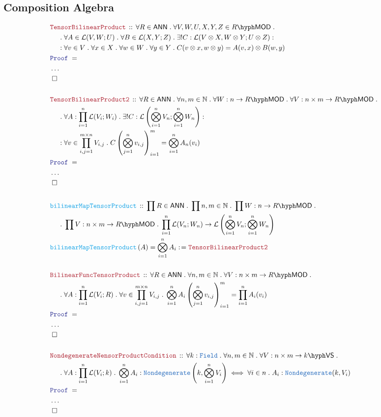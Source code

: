 \documentclass[12pt]{scrartcl}%
\newcommand{\TYPE}[1]{\textcolor{NavyBlue}{\mathtt{#1}}}%
\newcommand{\FUNC}[1]{\textcolor{Cerulean}{\mathtt{#1}}}%
\newcommand{\LOGIC}[1]{\textcolor{Blue}{\mathtt{#1}}}%
\newcommand{\THM}[1]{\textcolor{Maroon}{\mathtt{#1}}}%
\renewcommand{\.}{\; . \;} %
\newcommand{\de}{: \kern 0.1pc =} %
\newcommand{\Act}[1]{\left( #1 \right)} %
\newcommand{\Theorem}[2]{& \THM{#1} \, :: \, #2 \\ & \Proof = \\ } %
\newcommand{\DeclareFunc}[2]{& \FUNC{#1} \, :: \, #2 \\}%
\newcommand{\DefineNamedFunc}[4]{&  \FUNC{#1}\Act{#2} = #3 \de #4 \\}%
\newcommand{\NewLine}{\\ & \kern 1pc}%
\newcommand{\Page}[1]{ \begin{align*} #1 \end{align*}  }%
\newcommand{\NoProof}{ & \ldots \\ \EndProof}%
\newcommand{\Nat}{\mathbb{N}}%
\newcommand{\QED}{\; \square} %
\newcommand{\EndProof}{& \QED \\} %
\newcommand{\Proof}{\LOGIC{Proof} \; } %
\newcommand{\VS}[1]{#1\hyph\mathsf{VS}} %
\newcommand{\LMOD}[1]{#1\hyph\mathsf{MOD}} %
\renewcommand{\L}{\mathcal{L}}
\newcommand{\Field}{\TYPE{Field}}
\newcommand{\ANN}{\mathsf{ANN}} %
\begin{document}
\subsection{Composition Algebra}
\Page{
	\Theorem{TensorBilinearProduct}
	{
		\forall R \in \ANN \. 
		\forall V,W,U,X,Y,Z \in \LMOD{R} \. \NewLine \.
		\forall A \in \L(V,W;U) \. 
		\forall B \in \L(X,Y;Z) \.  
		\exists! C : \L(V \otimes X, W \otimes Y;U \otimes Z) : \NewLine : 
		\forall v \in V \. \forall x \in X \.
		\forall w \in W \. \forall y \in Y \.
		C(v \otimes x, w \otimes y) = A(v,x) \otimes B(w,y)
	}
	\NoProof
	\\
	\Theorem{TensorBilinearProduct2}
	{
		\forall R \in \ANN \. 
		\forall n,m \in \Nat \.
		\forall W : n \to \LMOD{R} \.
		\forall V : n \times m \to \LMOD{R} \. 
		\NewLine \.
		\forall A  : \prod^n_{i=1} \L(V_i;W_i) \. 
		\exists! C : \L\left( \bigotimes^n_{i=1} V_n ; \bigotimes^n_{i=1} W_n\right) : \NewLine : 
		\forall v \in \prod^{m \times n}_{i,j = 1} V_{i,j} \. 
		C\left(\bigotimes^n_{j=1} v_{i,j}\right)^m_{i=1} = \bigotimes^n_{i=1} A_n(v_i) 
	}
	\NoProof
	\\
	\DeclareFunc{bilinearMapTensorProduct}
	{ 
		\prod R \in \ANN \.
		\prod n,m \in \Nat \.  
		\prod W : n \to \LMOD{R} \. \NewLine \. 
		\prod V : n \times m \to \LMOD{R} \. 
		\prod^n_{i=1} \L(V_n;W_n)  \to \L\left(\bigotimes^n_{i=1} V_n; \bigotimes^n_{i=1} W_n\right) 
	}
	\DefineNamedFunc{bilinearMapTensorProduct}{A}{\bigotimes^n_{i=1} A_i}{ \THM{TensorBilinearProduct2}}
	\\
	\Theorem{BilinearFuncTensorProduct}
	{
		\forall R \in \ANN \.
		\forall n,m \in \Nat \.
		\forall V : n \times m \to \LMOD{R} \. \NewLine \.
		\forall A  : \prod^n_{i=1} \L(V_i;R) \. 
		\forall v \in \prod^{m \times n}_{i,j = 1} V_{i,j} \. 
		\bigotimes^n_{i=1} A_i \left(\bigotimes^n_{j=1} v_{i,j} \right)^m_{i=1} = \prod^n_{i=1} A_i(v_i)
	}
	\NoProof
	\\
	\Theorem{NondegenerateNensorProductCondition}
	{
		\forall k : \Field \.
		\forall n,m \in \Nat \.
		\forall V : n \times m \to \VS{k} \. \NewLine \.
		\forall A  : \prod^n_{i=1} \L(V_i;k) \. 
		\bigotimes^n_{i=1} A_i : \TYPE{Nondegenerate}\left( k,  \bigotimes^n_{i=1} V_i \right) \iff
		\forall i \in n \. A_i : \TYPE{Nondegenerate}(k, V_i)  
	}
	\NoProof
}
\end{document}
